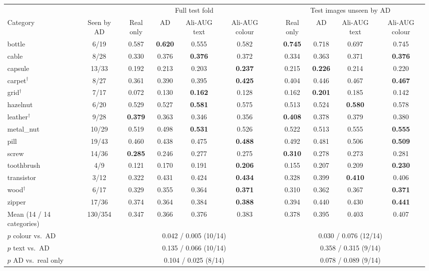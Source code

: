 \begin{tabular}{@{}l c cccc c cccc@{}}
\toprule
 & & \multicolumn{4}{c}{Full test fold} & & \multicolumn{4}{c}{Test images unseen by AD} \\
\cmidrule(lr){3-6}\cmidrule(lr){8-11}
Category & Seen by AD & Real only & AD & Ali-AUG text & Ali-AUG colour & & Real only & AD & Ali-AUG text & Ali-AUG colour \\
\midrule
bottle & 6/19 & 0.587 & \textbf{0.620} & 0.555 & 0.582 & & \textbf{0.745} & 0.718 & 0.697 & 0.745 \\
cable & 8/28 & 0.330 & 0.376 & \textbf{0.376} & 0.372 & & 0.334 & 0.363 & 0.371 & \textbf{0.376} \\
capsule & 13/33 & 0.192 & 0.213 & 0.203 & \textbf{0.237} & & 0.215 & \textbf{0.226} & 0.214 & 0.220 \\
carpet$^\dagger$ & 8/27 & 0.361 & 0.390 & 0.395 & \textbf{0.425} & & 0.404 & 0.446 & 0.467 & \textbf{0.467} \\
grid$^\dagger$ & 7/17 & 0.072 & 0.130 & \textbf{0.162} & 0.128 & & 0.162 & \textbf{0.201} & 0.185 & 0.142 \\
hazelnut & 6/20 & 0.529 & 0.527 & \textbf{0.581} & 0.575 & & 0.513 & 0.524 & \textbf{0.580} & 0.578 \\
leather$^\dagger$ & 9/28 & \textbf{0.379} & 0.363 & 0.346 & 0.356 & & \textbf{0.408} & 0.378 & 0.379 & 0.380 \\
metal\_nut & 10/29 & 0.519 & 0.498 & \textbf{0.531} & 0.526 & & 0.522 & 0.513 & 0.555 & \textbf{0.555} \\
pill & 19/43 & 0.460 & 0.438 & 0.475 & \textbf{0.488} & & 0.492 & 0.481 & 0.506 & \textbf{0.509} \\
screw & 14/36 & \textbf{0.285} & 0.246 & 0.277 & 0.275 & & \textbf{0.310} & 0.278 & 0.273 & 0.281 \\
toothbrush & 4/9 & 0.121 & 0.170 & 0.191 & \textbf{0.206} & & 0.155 & 0.207 & 0.209 & \textbf{0.230} \\
transistor & 3/12 & 0.322 & 0.431 & 0.424 & \textbf{0.434} & & 0.328 & 0.399 & \textbf{0.410} & 0.406 \\
wood$^\dagger$ & 6/17 & 0.329 & 0.355 & 0.364 & \textbf{0.371} & & 0.310 & 0.362 & 0.367 & \textbf{0.371} \\
zipper & 17/36 & 0.374 & 0.364 & 0.384 & \textbf{0.388} & & 0.394 & 0.440 & 0.430 & \textbf{0.441} \\
\midrule
Mean (14 / 14 categories) & 130/354 & 0.347 & 0.366 & 0.376 & 0.383 & & 0.378 & 0.395 & 0.403 & 0.407 \\
$p$ colour vs.\ AD & & \multicolumn{4}{c}{0.042 / 0.005 (10/14)} & & \multicolumn{4}{c}{0.030 / 0.076 (12/14)} \\
$p$ text vs.\ AD & & \multicolumn{4}{c}{0.135 / 0.066 (10/14)} & & \multicolumn{4}{c}{0.358 / 0.315 (9/14)} \\
$p$ AD vs.\ real only & & \multicolumn{4}{c}{0.104 / 0.025 (8/14)} & & \multicolumn{4}{c}{0.078 / 0.089 (9/14)} \\
\bottomrule
\end{tabular}
